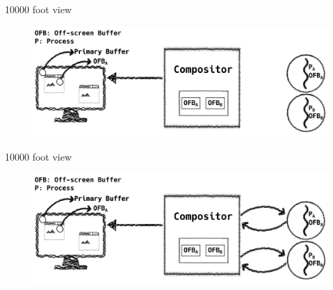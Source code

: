 \documentclass[10pt, compress, aspectratio=169]{beamer}
\begin{document}
\begin{frame}{10000 foot view}
  \begin{figure}
    \centering
    \includegraphics[width=\linewidth,
                     height=0.8\textheight,
                     keepaspectratio]{overview_graphics_drm_3-min}
  \end{figure}
\end{frame}

\begin{frame}{10000 foot view}
  \begin{figure}
    \centering
    \includegraphics[width=\linewidth,
                     height=0.8\textheight,
                     keepaspectratio]{overview_graphics_drm_4-min}
  \end{figure}
\end{frame}

\end{document}
